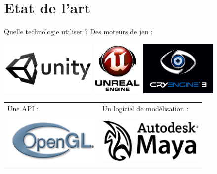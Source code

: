 \documentclass[a4paper,10pt]{beamer}
\begin{document}
	\section{Etat de l'art}
	
	\begin{frame}{Quelle technologie utiliser ?}
		 Des moteurs de jeu :
		\centerline{\includegraphics[height=75pt]{images/techno/unity-logo.png}
			\includegraphics[height=75pt]{images/techno/UE3_logo.png}
			\includegraphics[height=75pt]{images/techno/CryENGINE3-Logo.png}}
		\medbreak
		\begin{tabular}{l l}
			Une API : & Un logiciel de modélisation :\\
			\includegraphics[height=75pt]{images/techno/opengl-logo.jpg} & \includegraphics[height=60pt]{images/techno/auto.png}
		\end{tabular}
		
	\end{frame}
	
\end{document}
